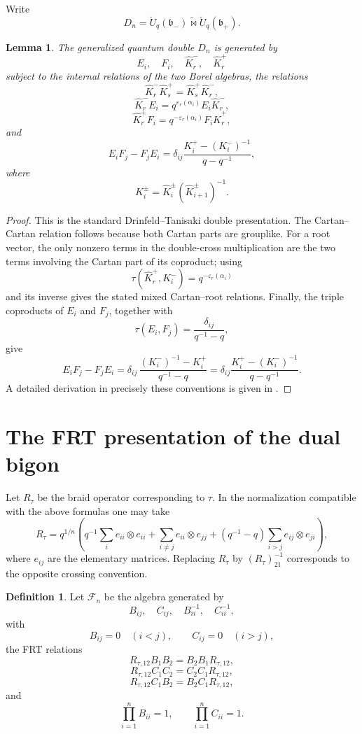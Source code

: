 \documentclass[11pt]{amsart}
\newtheorem{lemma}[theorem]{Lemma}
\theoremstyle{definition}
\newtheorem{definition}[theorem]{Definition}
\theoremstyle{remark}
\newcommand{\eps}{\varepsilon}
\begin{document}
Write
\[
D_n=\breve U_q(\mathfrak b_-)\mathbin{\widetilde\bowtie}
\breve U_q(\mathfrak b_+).
\]

\begin{lemma}\label{L:double-presentation}
The generalized quantum double \(D_n\) is generated by
\[
E_i,\quad F_i,\quad \hat K_r^-,\quad \hat K_r^+
\]
subject to the internal relations of the two Borel algebras, the
relations
\[
\hat K_r^-\hat K_s^+=\hat K_s^+\hat K_r^-,
\]
\[
\hat K_r^-E_i
=q^{\eps_r(\alpha_i)}E_i\hat K_r^-,
\]
\[
\hat K_r^+F_i
=q^{-\eps_r(\alpha_i)}F_i\hat K_r^+,
\]
and
\begin{equation}\label{E:EF-double}
E_iF_j-F_jE_i
=\delta_{ij}\frac{K_i^+-(K_i^-)^{-1}}{q-q^{-1}},
\end{equation}
where
\[
K_i^\pm=\hat K_i^\pm(\hat K_{i+1}^\pm)^{-1}.
\]
\end{lemma}

\begin{proof}
This is the standard Drinfeld--Tanisaki double presentation.  The
Cartan--Cartan relation follows because both Cartan parts are grouplike.
For a root vector, the only nonzero terms in the double-cross multiplication
are the two terms involving the Cartan part of its coproduct; using
\[
\tau(\hat K_r^+,K_i^-)
=q^{-\eps_r(\alpha_i)}
\]
and its inverse gives the stated mixed Cartan--root relations.  Finally,
the triple coproducts of \(E_i\) and \(F_j\), together with
\[
\tau(E_i,F_j)=\frac{\delta_{ij}}{q^{-1}-q},
\]
give
\[
E_iF_j-F_jE_i
=\delta_{ij}\,
\frac{(K_i^-)^{-1}-K_i^+}{q^{-1}-q}
=\delta_{ij}\frac{K_i^+-(K_i^-)^{-1}}{q-q^{-1}}.
\]
A detailed derivation in precisely these conventions is given in
\cite[Chapter~8]{KS}.
\end{proof}

\section{The FRT presentation of the dual bigon}

Let \(R_\tau\) be the braid operator corresponding to \(\tau\).  In the
normalization compatible with the above formulas one may take
\[
R_\tau
=
q^{1/n}\left(
q^{-1}\sum_i e_{ii}\otimes e_{ii}
+\sum_{i\ne j}e_{ii}\otimes e_{jj}
+(q^{-1}-q)\sum_{i>j}e_{ij}\otimes e_{ji}
\right),
\]
where \(e_{ij}\) are the elementary matrices.  Replacing \(R_\tau\) by
\((R_\tau)_{21}^{-1}\) corresponds to the opposite crossing convention.

\begin{definition}
Let \(\mathcal F_n\) be the algebra generated by
\[
B_{ij},\quad C_{ij},\quad B_{ii}^{-1},\quad C_{ii}^{-1},
\]
with
\[
B_{ij}=0\quad(i<j),\qquad C_{ij}=0\quad(i>j),
\]
the FRT relations
\[
R_{\tau,12}B_1B_2=B_2B_1R_{\tau,12},
\]
\[
R_{\tau,12}C_1C_2=C_2C_1R_{\tau,12},
\]
\[
R_{\tau,12}C_1B_2=B_2C_1R_{\tau,12},
\]
and
\[
\prod_{i=1}^n B_{ii}=1,\qquad
\prod_{i=1}^n C_{ii}=1.
\]
\end{definition}
\end{document}
